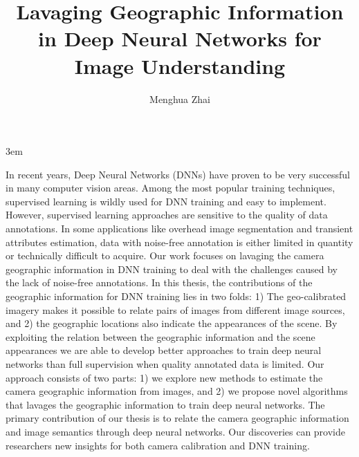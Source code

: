 \documentclass[final]{ukthesis}
\begin{document}
\emergencystretch 3em

\author{Menghua Zhai}
\title{Lavaging Geographic Information in Deep Neural Networks for Image Understanding}

\abstract
{ \SingleSpacing
In recent years, Deep Neural Networks (DNNs) have proven to be very
successful in many computer vision areas. Among the most popular
training techniques, supervised learning is wildly used for DNN
training and easy to implement. However, supervised
learning approaches are sensitive to the quality of data
annotations. In some applications like overhead image segmentation and
transient attributes estimation, data with noise-free annotation is
either limited in quantity or technically difficult to acquire.
Our work focuses on lavaging the camera geographic information in
DNN training to deal with the challenges caused by the lack of
noise-free annotations.
In this thesis, the contributions of the geographic information for
DNN training lies in two folds: 1) The geo-calibrated imagery makes it
possible to relate pairs of images from different image sources, and
2) the geographic locations also indicate the appearances of the
scene.
By exploiting the relation between the geographic information and the
scene appearances we are able to develop better approaches to train
deep neural networks than full supervision when quality annotated
data is limited.
Our approach consists of two parts: 1) we explore new methods
to estimate the camera geographic information from images, and 2) 
we propose novel algorithms that lavages the geographic information to
train deep neural networks.
The primary contribution of our thesis is to relate the camera
geographic information and image semantics through deep neural
networks. Our discoveries can provide researchers new insights for
both camera calibration and DNN training.
}


\frontmatter
\maketitle



\tableofcontents\clearpage

\mainmatter




\backmatter




\end{document}

